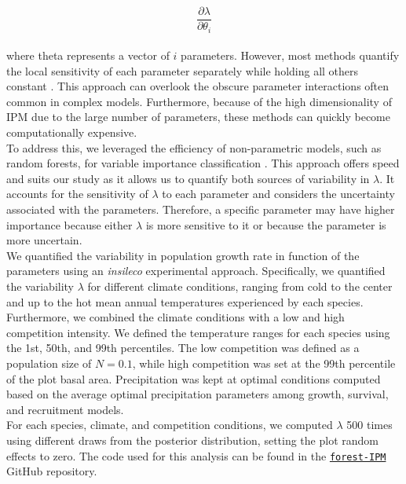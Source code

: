 \begin{equation}
 \frac{\partial \lambda}{\partial \theta_i}
\label{eq:sens}\end{equation}\\

where theta represents a vector of \(i\) parameters. However, most
methods quantify the local sensitivity of each parameter separately
while holding all others constant \citep{Saltelli2019}. This approach
can overlook the obscure parameter interactions often common in complex
models. Furthermore, because of the high dimensionality of IPM due to
the large number of parameters, these methods can quickly become
computationally expensive.\\

To address this, we leveraged the efficiency of non-parametric models,
such as random forests, for variable importance classification
\citep{antoniadis2021}. This approach offers speed and suits our study
as it allows us to quantify both sources of variability in \(\lambda\).
It accounts for the sensitivity of \(\lambda\) to each parameter and
considers the uncertainty associated with the parameters. Therefore, a
specific parameter may have higher importance because either \(\lambda\)
is more sensitive to it or because the parameter is more uncertain.\\

We quantified the variability in population growth rate in function of
the parameters using an \emph{insileco} experimental approach.
Specifically, we quantified the variability \(\lambda\) for different
climate conditions, ranging from cold to the center and up to the hot
mean annual temperatures experienced by each species. Furthermore, we
combined the climate conditions with a low and high competition
intensity. We defined the temperature ranges for each species using the
1st, 50th, and 99th percentiles. The low competition was defined as a
population size of \(N = 0.1\), while high competition was set at the
99th percentile of the plot basal area. Precipitation was kept at
optimal conditions computed based on the average optimal precipitation
parameters among growth, survival, and recruitment models.\\

For each species, climate, and competition conditions, we computed
\(\lambda\) 500 times using different draws from the posterior
distribution, setting the plot random effects to zero. The code used for
this analysis can be found in the
\href{https://github.com/willvieira/forest-IPM/tree/master/simulations/sensAnalysis_v3}{\texttt{forest-IPM}}
GitHub repository.\\

